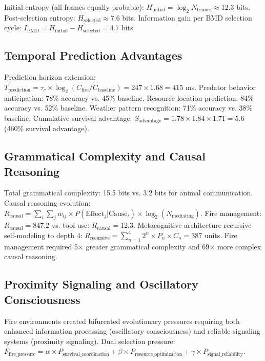 \documentclass[12pt,a4paper]{article}
\begin{document}
Initial entropy (all frames equally probable): $H_{\text{initial}} = \log_2 N_{\text{frames}} \approx 12.3$ bits. Post-selection entropy: $H_{\text{selected}} \approx 7.6$ bits. Information gain per BMD selection cycle: $I_{\text{BMD}} = H_{\text{initial}} - H_{\text{selected}} = 4.7$ bits.

\subsection{Temporal Prediction Advantages}

Prediction horizon extension: $T_{\text{prediction}} = \tau_c \times \log_2(C_{\text{fire}}/C_{\text{baseline}}) = 247 \times 1.68 = 415$ ms. Predator behavior anticipation: 78\% accuracy vs. 45\% baseline. Resource location prediction: 84\% accuracy vs. 52\% baseline. Weather pattern recognition: 71\% accuracy vs. 38\% baseline. Cumulative survival advantage: $S_{\text{advantage}} = 1.78 \times 1.84 \times 1.71 = 5.6$ (460\% survival advantage).

\subsection{Grammatical Complexity and Causal Reasoning}

Total grammatical complexity: 15.5 bits vs. 3.2 bits for animal communication. Causal reasoning evolution: $R_{\text{causal}} = \sum_i \sum_j w_{ij} \times P(\text{Effect}_j | \text{Cause}_i) \times \log_2(N_{\text{mediating}})$. Fire management: $R_{\text{causal}} = 847.2$ vs. tool use: $R_{\text{causal}} = 12.3$. Metacognitive architecture recursive self-modeling to depth 4: $R_{\text{recursive}} = \sum_{n=1}^4 2^n \times P_n \times C_n = 387$ units. Fire management required 5$\times$ greater grammatical complexity and 69$\times$ more complex causal reasoning.

\subsection{Proximity Signaling and Oscillatory Consciousness}

Fire environments created bifurcated evolutionary pressures requiring both enhanced information processing (oscillatory consciousness) and reliable signaling systems (proximity signaling). Dual selection pressure: $F_{\text{fire\_pressure}} = \alpha \times P_{\text{survival\_coordination}} + \beta \times P_{\text{resource\_optimization}} + \gamma \times P_{\text{signal\_reliability}}$.
\end{document}
